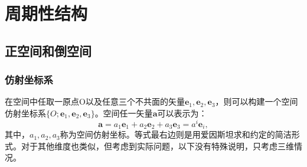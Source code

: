 \chapter{周期性结构}
\section{正空间和倒空间}
\subsection{仿射坐标系}
在空间中任取一原点O以及任意三个不共面的矢量$\boldsymbol{e}_1,\boldsymbol{e}_2,\boldsymbol{e}_3$，则可以构建一个空间仿射坐标系$\{O;\boldsymbol{e}_1,\boldsymbol{e}_2,\boldsymbol{e}_3\}$。空间任一矢量$\boldsymbol{a}$可以表示为：
\begin{equation}
    \boldsymbol{a} = a_1 \boldsymbol{e}_1 + a_2 \boldsymbol{e}_2 + a_3 \boldsymbol{e}_3 =a^i \boldsymbol{e}_i,
\end{equation}
其中，$a_1,a_2,a_3$称为空间仿射坐标。等式最右边则是用爱因斯坦求和约定的简洁形式。对于其他维度也类似，但考虑到实际问题，以下没有特殊说明，只考虑三维情况。
